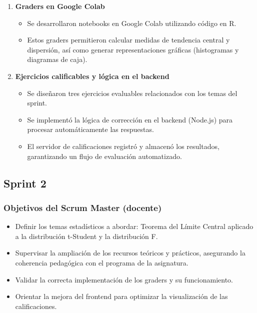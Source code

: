 \documentclass[letter,oneside,12pt,spanish]{report}
\begin{document}
\begin{enumerate}
	\item \textbf{Graders en Google Colab}
	\begin{itemize}
		\item Se desarrollaron notebooks en Google Colab utilizando código en R.
		\item Estos graders permitieron calcular medidas de tendencia central y dispersión, así como generar representaciones gráficas (histogramas y diagramas de caja).
	\end{itemize}
	
	\item \textbf{Ejercicios calificables y lógica en el backend}
	\begin{itemize}
		\item Se diseñaron tres ejercicios evaluables relacionados con los temas del sprint.
		\item Se implementó la lógica de corrección en el backend (Node.js) para procesar automáticamente las respuestas.
		\item El servidor de calificaciones registró y almacenó los resultados, garantizando un flujo de evaluación automatizado.
	\end{itemize}
\end{enumerate}

\subsection{Sprint 2}

\subsubsection*{Objetivos del Scrum Master (docente)}
\begin{itemize}
	\item Definir los temas estadísticos a abordar: Teorema del Límite Central aplicado a la distribución t-Student y la distribución F.
	\item Supervisar la ampliación de los recursos teóricos y prácticos, asegurando la coherencia pedagógica con el programa de la asignatura.
	\item Validar la correcta implementación de los graders y su funcionamiento.
	\item Orientar la mejora del frontend para optimizar la visualización de las calificaciones.
\end{itemize}
\end{document}
